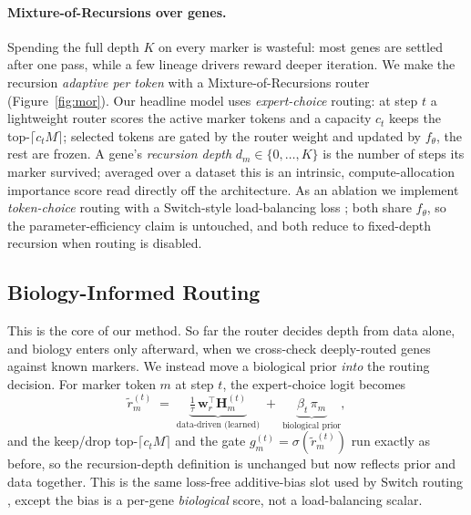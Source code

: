 \documentclass[letterpaper]{article}
\begin{document}
\paragraph{Mixture-of-Recursions over genes.}
Spending the full depth $K$ on every marker is wasteful: most genes are settled after
one pass, while a few lineage drivers reward deeper iteration. We make the recursion
\emph{adaptive per token} with a Mixture-of-Recursions router \cite{bae2025mixture}
(Figure~\ref{fig:mor}). Our headline model uses \emph{expert-choice} routing: at step
$t$ a lightweight router scores the active marker tokens and a capacity $c_t$ keeps
the top-$\lceil c_t M\rceil$; selected tokens are gated by the router weight and
updated by $f_\theta$, the rest are frozen. A gene's \emph{recursion depth}
$d_m\in\{0,\dots,K\}$ is the number of steps its marker survived; averaged over a
dataset this is an intrinsic, compute-allocation importance score read directly off
the architecture. As an ablation we implement \emph{token-choice} routing
\cite{bae2025mixture} with a Switch-style load-balancing loss
\cite{shazeer2017outrageously}; both share $f_\theta$, so the parameter-efficiency
claim is untouched, and both reduce to fixed-depth recursion when routing is disabled.

\subsection{Biology-Informed Routing}
\label{sec:biorouter}
This is the core of our method. So far the router decides depth from data alone, and
biology enters only afterward, when we cross-check deeply-routed genes against known
markers. We instead move a biological prior \emph{into} the routing decision. For
marker token $m$ at step $t$, the expert-choice logit becomes
\begin{equation}
\tilde r^{(t)}_m \;=\; \underbrace{\tfrac{1}{\tau}\,\mathbf{w}_r^{\top}\mathbf{H}^{(t)}_m}_{\text{data-driven (learned)}}
\;+\; \underbrace{\beta_t\,\pi_m}_{\text{biological prior}},
\label{eq:biorouter}
\end{equation}
and the keep/drop top-$\lceil c_t M\rceil$ and the gate
$g^{(t)}_m=\sigma(\tilde r^{(t)}_m)$ run exactly as before, so the recursion-depth
definition is unchanged but now reflects prior and data together. This is the same
loss-free additive-bias slot used by Switch routing \cite{shazeer2017outrageously},
except the bias is a per-gene \emph{biological} score, not a load-balancing scalar.
\end{document}
